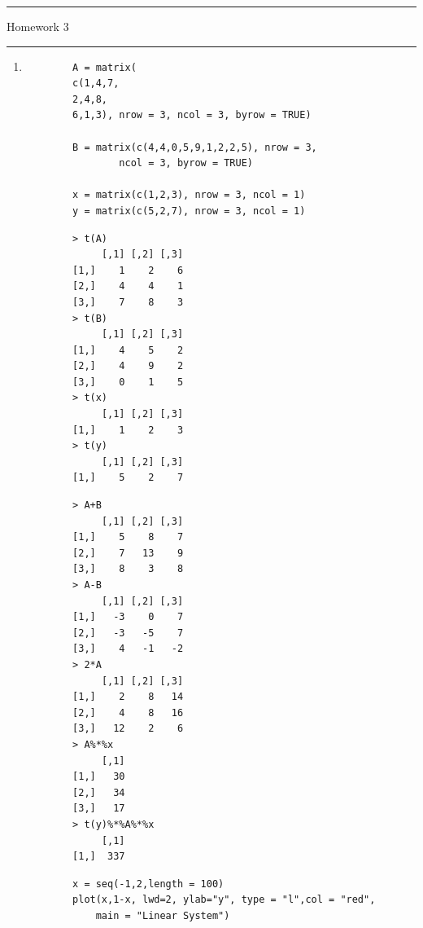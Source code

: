 \documentclass[letterpaper,12pt]{article}
\begin{document}
\thispagestyle{empty}

\hrule \vspace{0.5em}
 \hfill Homework 3 \newline \hrule

\vspace{1em}

\begin{enumerate}
\item 
{} 
\begin{lstlisting}
        A = matrix(
        c(1,4,7,
        2,4,8,
        6,1,3), nrow = 3, ncol = 3, byrow = TRUE)
        
        B = matrix(c(4,4,0,5,9,1,2,2,5), nrow = 3, 
                ncol = 3, byrow = TRUE)
        
        x = matrix(c(1,2,3), nrow = 3, ncol = 1)
        y = matrix(c(5,2,7), nrow = 3, ncol = 1)
\end{lstlisting}

\begin{lstlisting}
        > t(A)
             [,1] [,2] [,3]
        [1,]    1    2    6
        [2,]    4    4    1
        [3,]    7    8    3
        > t(B)
             [,1] [,2] [,3]
        [1,]    4    5    2
        [2,]    4    9    2
        [3,]    0    1    5
        > t(x)
             [,1] [,2] [,3]
        [1,]    1    2    3
        > t(y)
             [,1] [,2] [,3]
        [1,]    5    2    7
\end{lstlisting}

\begin{lstlisting}
        > A+B
             [,1] [,2] [,3]
        [1,]    5    8    7
        [2,]    7   13    9
        [3,]    8    3    8
        > A-B
             [,1] [,2] [,3]
        [1,]   -3    0    7
        [2,]   -3   -5    7
        [3,]    4   -1   -2
        > 2*A
             [,1] [,2] [,3]
        [1,]    2    8   14
        [2,]    4    8   16
        [3,]   12    2    6
        > A%*%x
             [,1]
        [1,]   30
        [2,]   34
        [3,]   17
        > t(y)%*%A%*%x
             [,1]
        [1,]  337
\end{lstlisting}


\begin{lstlisting}
        x = seq(-1,2,length = 100)
        plot(x,1-x, lwd=2, ylab="y", type = "l",col = "red",
            main = "Linear System")
        

\end{lstlisting}
\end{enumerate}
\end{document}
